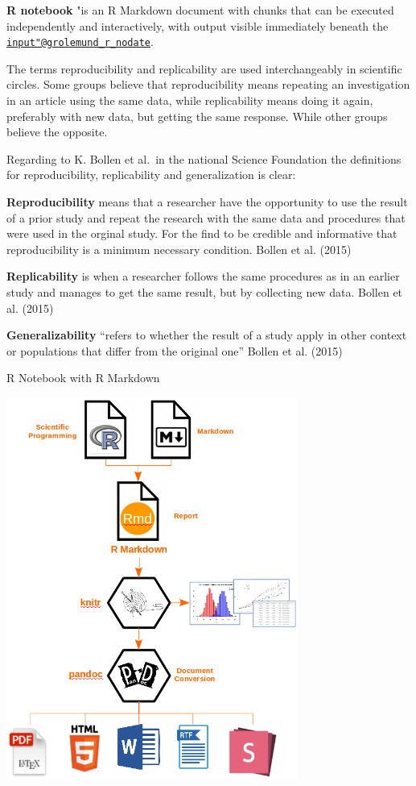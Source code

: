 \documentclass[
]{article}
\begin{document}
\textbf{R notebook} "is an R Markdown document with chunks that can be
executed independently and interactively, with output visible
immediately beneath the
\href{mailto:input\%22@grolemund_r_nodate}{\nolinkurl{input"@grolemund\_r\_nodate}}.

The terms reproducibility and replicability are used interchangeably in
scientific circles. Some groups believe that reproducibility means
repeating an investigation in an article using the same data, while
replicability means doing it again, preferably with new data, but
getting the same response. While other groups believe the opposite.

Regarding to K. Bollen et al.~in the national Science Foundation the
definitions for reproducibility, replicability and generalization is
clear:

\textbf{Reproducibility} means that a researcher have the opportunity to
use the result of a prior study and repeat the research with the same
data and procedures that were used in the orginal study. For the find to
be credible and informative that reproducibility is a minimum necessary
condition. Bollen et al. (2015)

\textbf{Replicability} is when a researcher follows the same procedures
as in an earlier study and manages to get the same result, but by
collecting new data. Bollen et al. (2015)

\textbf{Generalizability} ``refers to whether the result of a study
apply in other context or populations that differ from the original
one'' Bollen et al. (2015)

R Notebook with R Markdown

\includegraphics[width=3.76042in,height=\textheight]{rmarkdown_workflow.png}
\end{document}
